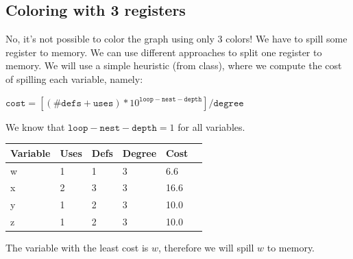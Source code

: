 \subsection{Coloring with 3 registers}

No, it's not possible to color the graph using only 3 colors! We have to spill some register to memory.
We can use different approaches to split one register to memory. We will use a simple heuristic (from class),
where we compute the cost of spilling each variable, namely:

$\mathtt{cost} = [(\# \mathtt{defs} + \mathtt{uses}) * 10^{\mathtt{loop-nest-depth}}]/\mathtt{degree}$

We know that $\mathtt{loop-nest-depth} = 1$ for all variables.

\begin{center}
    \begin{tabular}{ | l | l | l | l | l | l |}
    \hline
    Variable & Uses & Defs & Degree & Cost \\ \hline
    w & 1 & 1 & 3 & 6.6 \\ \hline
    x & 2 & 3 & 3 & 16.6 \\ \hline
    y & 1 & 2 & 3 & 10.0 \\ \hline
    z & 1 & 2 & 3 & 10.0 \\ \hline
    \hline
    \end{tabular}
\end{center}

The variable with the least cost is $w$, therefore we will spill $w$ to memory.